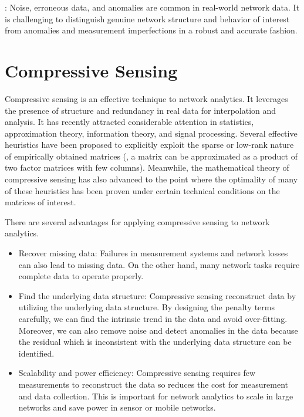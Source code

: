 : Noise, erroneous data, and anomalies are common in real-world network data. It is challenging to distinguish genuine network structure and behavior of interest from anomalies and measurement imperfections in a robust and accurate fashion. 

\section{Compressive Sensing}
\label{sec:compressive_sensing}

Compressive sensing is an effective technique to network analytics. It leverages the presence of structure and redundancy in real data for interpolation and analysis. It has recently attracted considerable attention in statistics, approximation theory, information theory, and signal processing. Several effective heuristics have been proposed to explicitly exploit the sparse or low-rank nature of empirically obtained matrices (\ie, a matrix can be approximated as a product of two factor matrices with few columns). Meanwhile, the mathematical theory of compressive sensing has also advanced to the point where the optimality of many of these heuristics has been proven under certain technical conditions on the matrices of interest.

There are several advantages for applying compressive sensing to network analytics. 

\begin{itemize}
\item Recover missing data: Failures in measurement systems and network losses can also lead to missing data. On the other hand, many network tasks require complete data to operate properly. 

\item Find the underlying data structure: Compressive sensing reconstruct data by utilizing the underlying data structure. By designing the penalty terms carefully, we can find the intrinsic trend in the data and avoid over-fitting. Moreover, we can also remove noise and detect anomalies in the data because the residual which is inconsistent with the underlying data structure can be identified. 

\item Scalability and power efficiency: Compressive sensing requires few measurements to reconstruct the data so reduces the cost for measurement and data collection. This is important for network analytics to scale in large networks and save power in sensor or mobile networks. 
\end{itemize}

